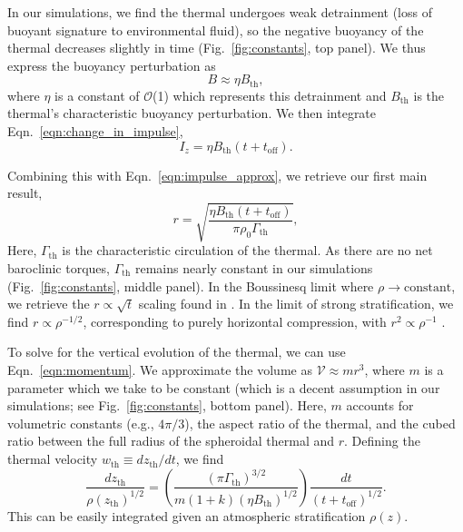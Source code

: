 In our simulations, we find the thermal undergoes weak detrainment (loss of buoyant signature to environmental fluid), so the negative buoyancy of the thermal decreases slightly in time (Fig.~\ref{fig:constants}, top panel).
We thus express the buoyancy perturbation as 
\begin{equation}
B \approx \eta B_{\text{th}},
\end{equation}
where $\eta$ is a constant of $\mathcal{O}$(1) which represents this detrainment and $B_{\text{th}}$ is the thermal's characteristic buoyancy perturbation. 
We then integrate Eqn.~\ref{eqn:change_in_impulse},
\begin{equation*}
I_z = \eta B_{\text{th}} (t + t_{\text{off}}).
\end{equation*}

Combining this with Eqn.~\ref{eqn:impulse_approx}, we retrieve our first main result,
\begin{equation}
r = \sqrt{\frac{\eta B_{\text{th}} (t + t_{\text{off}})}{\pi\rho_0\Gamma_{\text{th}}}},
\label{eqn:r_theory}
\end{equation}
Here, $\Gamma_{\text{th}}$ is the characteristic circulation of the thermal. As there are no net baroclinic torques, $\Gamma_{\text{th}}$ remains nearly constant in our simulations (Fig.~\ref{fig:constants}, middle panel).
In the Boussinesq limit where $\rho \rightarrow \text{constant}$, we retrieve the $r \propto \sqrt{t}$ scaling found in \LJ.
In the limit of strong stratification, we find $r \propto \rho^{-1/2}$, corresponding to purely horizontal compression, with $r^2 \propto \rho^{-1}$ \cite{brandenburg2016}.

To solve for the vertical evolution of the thermal, we can use Eqn.~\ref{eqn:momentum}.
We approximate the volume as $\mathcal{V} \approx m r^3$, where $m$ is a parameter which we take to be constant (which is a decent assumption in our simulations; see Fig.~\ref{fig:constants}, bottom panel).
Here, $m$ accounts for volumetric constants (e.g., $4\pi/3$), the aspect ratio of the thermal, and the cubed ratio between the full radius of the spheroidal thermal and $r$.
Defining the thermal velocity $w_{\text{th}} \equiv dz_{\text{th}}/dt$, we find
\begin{equation}
\frac{dz_{\text{th}}}{\rho(z_{\text{th}})^{1/2}} =
\left(\frac{(\pi\Gamma_{\text{th}})^{3/2}}{m(1 + k)(\eta B_{\text{th}})^{1/2}}\right)\frac{dt}{(t + t_{\text{off}})^{1/2}}.
\label{eqn:dz_theory}
\end{equation}
This can be easily integrated given an atmospheric stratification $\rho(z)$.

